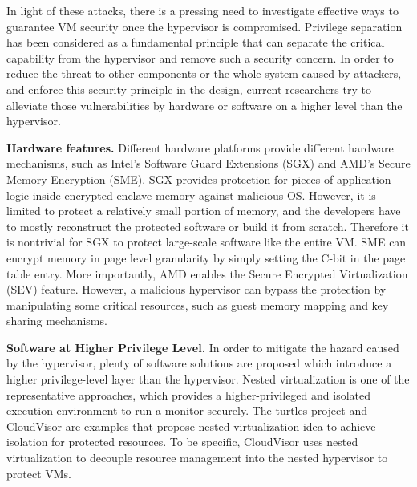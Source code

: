 \documentclass[10pt, numbers, preprint ]{sigplanconf}
\begin{document}
{In light of these attacks, there is a pressing need to investigate effective ways to guarantee VM security once the hypervisor is compromised. Privilege separation\cite{DBLP:conf/ndss/ChoKYP17, murray2008privilege, burdonov2009virtualization, chen2011linux} has been considered as a fundamental principle that can separate the critical capability from the hypervisor and remove such a security concern. In order to reduce the threat to other components or the whole system caused by attackers, and enforce this security principle in the design, current researchers try to alleviate those vulnerabilities by hardware or software on a higher level than the hypervisor.

\textbf{Hardware features.} Different hardware platforms provide different hardware mechanisms, such as Intel’s Software Guard Extensions (SGX)\cite{sgx1} \cite{sgx2} \cite{sgx3} and AMD’s Secure Memory Encryption (SME)\cite{DBLP:conf/hpca/WuLLCZG18}. SGX provides protection for pieces of application logic inside encrypted enclave memory against malicious OS. However, it is limited to protect a relatively small portion of memory, and the developers have to mostly reconstruct the protected software or build it from scratch\cite{sgxexplain}. Therefore it is nontrivial for SGX to protect large-scale software like the entire VM. SME can encrypt memory in page level granularity by simply setting the C-bit in the page table entry. %
More importantly, AMD enables the Secure Encrypted Virtualization (SEV) feature\cite{}. However, a malicious hypervisor can bypass the protection by manipulating some critical resources, such as guest memory mapping and key sharing mechanisms.

\textbf{Software at Higher Privilege Level.} In order to mitigate the hazard caused by the hypervisor, plenty of software solutions are proposed which introduce a higher privilege-level layer than the hypervisor. Nested virtualization is one of the representative approaches, which provides a higher-privileged and isolated execution environment to run a monitor securely. The turtles project\cite{DBLP:conf/osdi/Ben-YehudaDDFHGLWY10} and CloudVisor\cite{DBLP:conf/sosp/ZhangCCZ11} are examples that propose nested virtualization idea to achieve isolation for protected resources. To be specific, CloudVisor uses nested virtualization to decouple resource management into the nested hypervisor to protect VMs.

}
\end{document}
